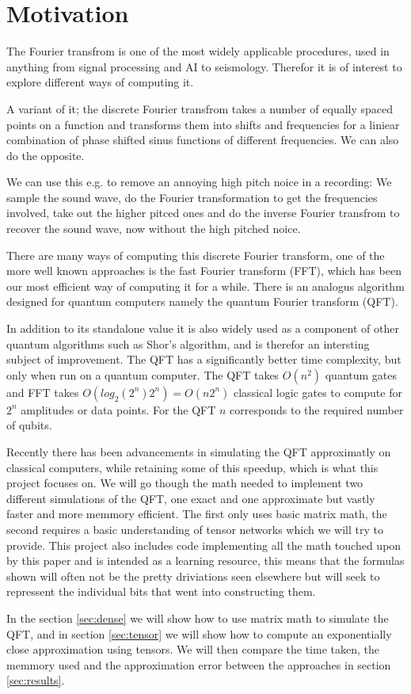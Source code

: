 \section{Motivation}
The Fourier transfrom is one of the most widely applicable procedures, used in anything from signal processing and AI to seismology. Therefor it is of interest to explore different ways of computing it. 


A variant of it; the discrete Fourier transfrom takes a number of equally spaced points on a function 
and transforms them into shifts and frequencies for a liniear combination of phase shifted sinus functions of different frequencies. 
We can also do the opposite. 


We can use this e.g. to remove an annoying high pitch noice in a recording: 
We sample the sound wave, do the Fourier transformation to get the frequencies involved, 
take out the higher pitced ones and do the inverse Fourier transfrom to recover the sound wave, now without the high pitched noice. 


There are many ways of computing this discrete Fourier transform,
one of the more well known approaches is the fast Fourier transform (FFT), which has been our most efficient way of computing it for a while. 
There is an analogus algorithm designed for quantum computers namely the quantum Fourier transform (QFT). 


In addition to its standalone value it is also widely used as a component of other quantum algorithms such as Shor's algorithm, and is therefor an intersting subject of improvement. 
The QFT has a significantly better time complexity, but only when run on a quantum computer. The QFT takes $O(n^2)$ quantum gates and FFT takes $O(log_{2}(2^n) 2^n) = O(n2^n)$ classical logic gates to compute for $2^n$ amplitudes or data points. For the QFT $n$ corresponds to the required number of qubits. 


Recently there has been advancements in simulating the QFT approximatly on classical computers, while retaining some of this speedup, which is what this project focuses on. We will go though the math needed to implement two different simulations of the QFT, one exact and one approximate but vastly faster and more memmory efficient. The first only uses basic matrix math, the second requires a basic understanding of tensor networks which we will try to provide. This project also includes code implementing all the math touched upon by this paper and is intended as a learning resource, this means that the formulas shown will often not be the pretty driviations seen elsewhere but will seek to repressent the individual bits that went into constructing them.  


In the section \ref{sec:dense} we will show how to use matrix math to simulate the QFT, and in section \ref{sec:tensor} we will show how to compute an exponentially close approximation using tensors. We will then compare the time taken, the memmory used and the approximation error between the approaches in section \ref{sec:results}.
